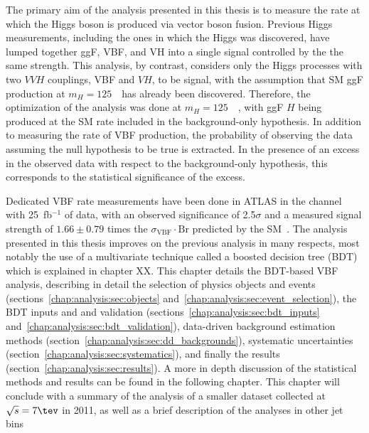 
The primary aim of the analysis presented in this thesis is to measure the rate at which the
Higgs boson is produced via vector boson fusion. Previous Higgs
measurements, including the ones in which the Higgs was discovered,
have lumped together ggF, VBF, and VH into a single signal controlled
by the the same strength. This analysis, by contrast, considers only the
Higgs processes with two $VVH$ couplings, VBF and $VH$, to be
signal, with the assumption that SM ggF production at
$m_H=125$~\gev~has already been discovered. Therefore, the
optimization of the analysis was done at $m_H=125$~\gev~, with ggF $H$
being produced at the SM rate included in the background-only hypothesis. In
addition to measuring the rate of VBF production, the probability of
observing the data assuming the null hypothesis to be true is
extracted. In the presence of an excess in the observed data with
respect to the background-only hypothesis, this
corresponds to the statistical significance of the excess.

Dedicated VBF rate measurements have been done in ATLAS in the \wwlnln
channel with 25~fb$^{-1}$ of data, with an observed significance of 2.5$\sigma$ and
a measured signal strength of $1.66\pm 0.79$ times the
$\sigma_{\mathrm{VBF}}\cdot{\mathrm{Br}}$ predicted by the
SM~\cite{bib:hww_moriond_2013}. The analysis presented in this thesis
improves on the previous analysis in
many respects, most notably the use of a multivariate technique called
a boosted decision tree (BDT) which is explained in chapter
XX. This chapter details the BDT-based VBF analysis, describing in
detail the selection of physics objects and events
(sections~\ref{chap:analysis:sec:objects} and~\ref{chap:analysis:sec:event_selection}), the
BDT inputs and and validation
(sections~\ref{chap:analysis:sec:bdt_inputs} and~\ref{chap:analysis:sec:bdt_validation}),
data-driven background estimation
methods (section~\ref{chap:analysis:sec:dd_backgrounds}), systematic
uncertainties (section~\ref{chap:analysis:sec:systematics}),
and finally the results (section~\ref{chap:analysis:sec:results}). A
more in depth discussion of the statistical methods and results can be
found in the following chapter. This chapter will conclude with a
summary of the analysis of a smaller dataset collected at $\sqrts =
7 \tev$ in 2011, as well as a brief description of the \hww analyses
in other jet bins
